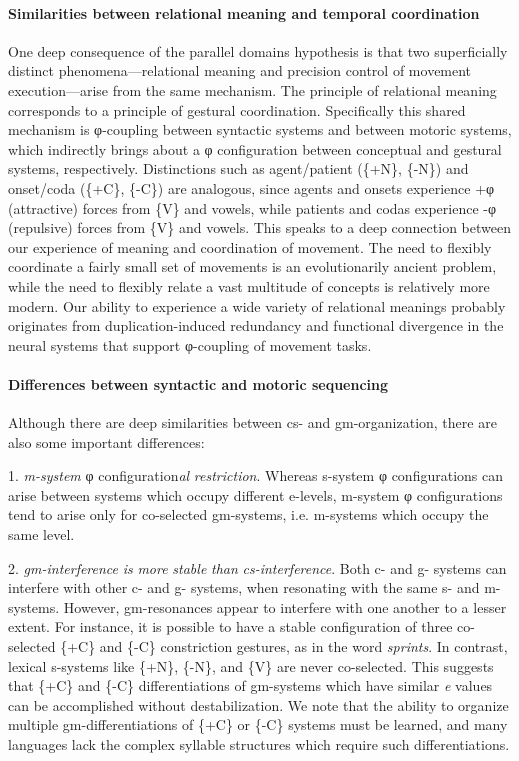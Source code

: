 \paragraph{Similarities between relational meaning and temporal coordination}

One deep consequence of the parallel domains hypothesis is that two superficially distinct phenomena—relational meaning and precision control of movement execution—arise from the same mechanism. The principle of relational meaning corresponds to a principle of gestural coordination. Specifically this shared mechanism is φ-coupling between syntactic systems and between motoric systems, which indirectly brings about a φ configuration between conceptual and gestural systems, respectively. Distinctions such as agent/patient (\{+N\}, \{-N\}) and onset/coda (\{+C\}, \{-C\}) are analogous, since agents and onsets experience +φ (attractive) forces from \{V\} and vowels, while patients and codas experience -φ (repulsive) forces from \{V\} and vowels. This speaks to a deep connection between our experience of meaning and coordination of movement. The need to flexibly coordinate a fairly small set of movements is an evolutionarily ancient problem, while the need to flexibly relate a vast multitude of concepts is relatively more modern. Our ability to experience a wide variety of relational meanings probably originates from duplication-induced redundancy and functional divergence in the neural systems that support φ-coupling of movement tasks. 

\paragraph{Differences between syntactic and motoric sequencing} 

Although there are deep similarities between cs- and gm-organization, there are also some important differences: 

1. \textit{m-system} φ configuration\textit{al} \textit{restriction}. Whereas s-system φ configurations can arise between systems which occupy different e-levels, m-system φ configurations tend to arise only for co-selected gm-systems, i.e. m-systems which occupy the same level. 

2. \textit{gm-interference} \textit{is} \textit{more} \textit{stable} \textit{than} \textit{cs-interference}. Both c- and g- systems can interfere with other c- and g- systems, when resonating with the same s- and m- systems. However, gm-resonances appear to interfere with one another to a lesser extent. For instance, it is possible to have a stable configuration of three co-selected \{+C\} and \{-C\} constriction gestures, as in the word \textit{sprints}. In contrast, lexical s-systems like \{+N\}, \{-N\}, and \{V\} are never co-selected. This suggests that \{+C\} and \{-C\} differentiations of gm-systems which have similar \textit{e} values can be accomplished without destabilization. We note that the ability to organize multiple gm-differentiations of \{+C\} or \{-C\} systems must be learned, and many languages lack the complex syllable structures which require such differentiations.


